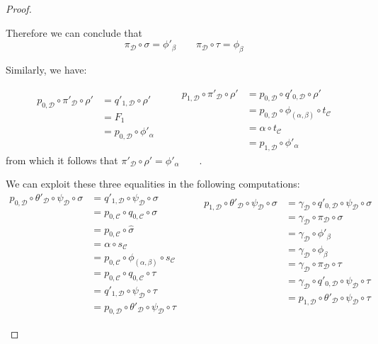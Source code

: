 \documentclass[a4paper,UKenglish,cleveref,pdftex,thm-restate,numberwithinsect]{lipics-v2021}
\begin{document}
\begin{proof}
\begin{enumerate}
\begin{itemize}
			Therefore we can conclude that
			\[\pi_{\mathcal{D}}\circ \sigma = \phi'_\beta \qquad \pi_{\mathcal{D}}\circ \tau = \phi_\beta \]
			
			
			Similarly, we have:
			
			\[\begin{split}
				p_{0, \mathcal{D}}\circ \pi'_{\mathcal{D}}\circ \rho' &= q'_{1, \mathcal{D}}\circ \rho' \\&=F_1\\&=p_{0, \mathcal{D}}\circ  \phi'_{\alpha} \\ & \end{split} \qquad\begin{split}
				p_{1, \mathcal{D}}\circ \pi'_{\mathcal{D}}\circ \rho' &=  p_{0, \mathcal{D}}\circ q'_{0, \mathcal{D}} \circ  \rho' \\&=p_{0, \mathcal{D}}\circ \phi_{(\alpha, \beta)} \circ t_{\mathcal{C}}\\&=\alpha \circ t_{\mathcal{C}}\\&=p_{1, \mathcal{D}}\circ \phi'_\alpha\end{split} \] 
			from which it follows that $\pi'_{\mathcal{D}}\circ \rho' =\phi'_\alpha \qquad$.
			
			
			We can exploit these three equalities in the following computations:
 			\[\begin{split}
 				p_{0, \mathcal{D}}\circ \theta'_{\mathcal{D}}\circ \psi_{\mathcal{D}} \circ \sigma &=q'_{1, \mathcal{D}}\circ \psi_{\mathcal{D}}\circ \sigma\\&= p_{0, \mathcal{C}}\circ q_{0, \mathcal{C}}\circ \sigma \\&= p_{0, \mathcal{C}}\circ \hat{\sigma}\\&=  \alpha \circ s_{\mathcal{C}}
 				\\&= p_{0, \mathcal{C}}\circ \phi_{(\alpha, \beta)}\circ s_{\mathcal{C}}
 				\\&= p_{0, \mathcal{C}}\circ q_{0, \mathcal{C}}\circ \tau
 				\\&=q'_{1, \mathcal{D}}\circ \psi_{\mathcal{D}}\circ\tau 
 				\\&= p_{0, \mathcal{D}}\circ \theta'_{\mathcal{D}}\circ \psi_{\mathcal{D}}\circ \tau
 			\end{split} \qquad \begin{split}
 			p_{1, \mathcal{D}}\circ \theta'_{\mathcal{D}}\circ \psi_{\mathcal{D}} \circ \sigma &=\gamma_{\mathcal{D}}\circ q'_{0, \mathcal{D}}\circ \psi_{\mathcal{D}}\circ \sigma\\&=\gamma_{\mathcal{D}}\circ \pi_{\mathcal{D}}\circ \sigma\\&= \gamma_{\mathcal{D}}\circ \phi'_{\beta}\\&=  \gamma_{\mathcal{D}}\circ \phi_{\beta}
 			\\&= \gamma_{\mathcal{D}}\circ \pi_{\mathcal{D}}\circ \tau
 			\\&= \gamma_{\mathcal{D}}\circ q'_{0, \mathcal{D}}\circ \psi_{\mathcal{D}}\circ \tau
 			\\&= p_{1, \mathcal{D}}\circ \theta'_{\mathcal{D}}\circ \psi_{\mathcal{D}}\circ \tau\\&
 			\end{split}\]
			

\end{itemize}
\end{enumerate}
\end{proof}
\end{document}

